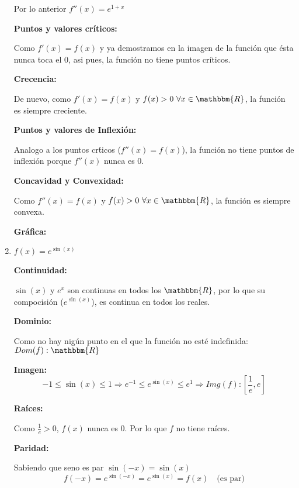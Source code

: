 \documentclass[12pt]{article}
\begin{document}
\begin{enumerate}[\hspace{9px} a)]
            Por lo anterior \(f''(x) = e^{1+x}\)\medskip

        \textbf{Puntos y valores cr\'iticos: }\medskip

            Como \(f'(x)=f(x)\) y ya demostramos en la imagen de la funci\'on que \'esta nunca toca el 0, asi pues, la funci\'on no tiene puntos cr\'iticos.\medskip

        \textbf{Crecencia: }\medskip

            De nuevo, como \(f'(x)=f(x)\) y \(f(x)>0 \ \forall x\in\mathbbm{R}\), la funci\'on es siempre creciente.\medskip

        \textbf{Puntos y valores de Inflexi\'on: }\medskip

            Analogo a los puntos cr\'ticos (\(f''(x)=f(x)\)), la funci\'on no tiene puntos de inflexi\'on porque \(f''(x)\) nunca es 0.\medskip

        \textbf{Concavidad y Convexidad: }\medskip

            Como \(f''(x)=f(x)\) y \(f(x)>0 \ \forall x\in\mathbbm{R}\), la funci\'on es siempre convexa.\medskip

        \textbf{Gr\'afica: }

    \item \(f(x)=e^{\sin(x)}\)\medskip
    
        \textbf{Continuidad: }\medskip

            \(\sin(x)\) y \(e^x\) son continuas en todos los \(\mathbbm{R}\), por lo que su compocisi\'on (\(e^{\sin(x)}\)), es continua en todos los reales.\medskip

        \textbf{Dominio: }\medskip

            Como no hay nig\'un punto en el que la funci\'on no est\'e indefinida: \(Dom(f): \mathbbm{R}\)\medskip

        \textbf{Imagen: }
            \begin{equation*}
                -1\leq\sin(x)\leq1 \Longrightarrow e^{-1}\leq e^{\sin(x)}\leq e^1 \Longrightarrow Img(f):\left[\frac{1}{e},e\right]
            \end{equation*}

        \textbf{Ra\'ices: }\medskip

            Como \(\frac{1}{e}>0\), $f(x)$ nunca es 0. Por lo que \(f\) no tiene ra\'ices.\medskip

        \textbf{Paridad: }\medskip

            Sabiendo que seno es par \(\sin(-x)=\sin(x)\)
            \begin{equation*}
                f(-x) = e^{\sin(-x)} = e^{\sin(x)} = f(x) \quad \text{(es par)}
            \end{equation*}


\end{enumerate}
\end{document}
